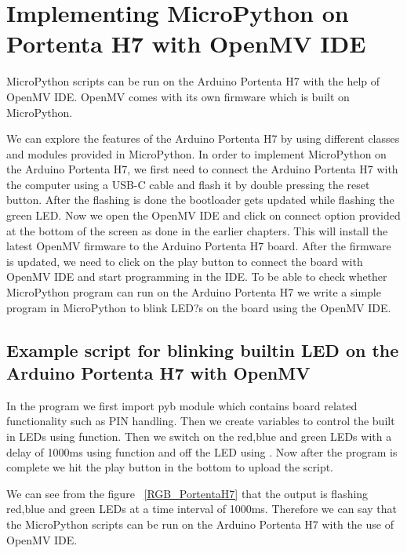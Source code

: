 \section{Implementing MicroPython on Portenta H7 with OpenMV IDE}
 MicroPython scripts can be run on the Arduino Portenta H7 with the help of OpenMV IDE. OpenMV comes with its own firmware which is built on MicroPython. \cite{openmv_docs:2024}
 
 We can explore the features of the Arduino Portenta H7 by using different classes and  modules provided in MicroPython.
 In order to implement MicroPython on the Arduino Portenta H7, we first need to  connect the Arduino Portenta H7 with the computer using a USB-C cable and flash  it by double pressing the reset button. After the flashing is done the bootloader gets updated while flashing the green LED. Now we open the OpenMV IDE and click on connect option provided at the bottom of the screen as done in the earlier chapters. This will install the latest OpenMV firmware to the Arduino Portenta H7 board. After the firmware is updated, we need to click on the play button to connect the board  with OpenMV IDE and start programming in the IDE. To be able to check whether MicroPython program can run on the Arduino Portenta H7 we write a simple program in MicroPython to blink LED?s on the board using the OpenMV IDE.
 
\subsection{Example script for blinking builtin LED on the Arduino	Portenta H7 with OpenMV}
In the program we first import pyb module which contains board related functionality such as PIN handling. Then we create variables to control the built in LEDs using  function. Then we switch on the red,blue and green LEDs with a delay of 1000ms using  function and off the LED using . Now after the program is complete we hit the play button in the bottom to upload the script.

We can see from the figure ~\ref{RGB_PortentaH7} that the output is flashing red,blue and green LEDs at a time interval of 1000ms. Therefore we can say that the MicroPython scripts can be run on the Arduino Portenta H7 with the use of OpenMV IDE.

